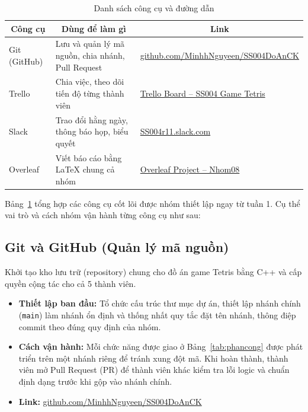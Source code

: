 \documentclass[a4paper]{article}
\begin{document}
\begin{table}[H]
\centering

\begin{tabularx}{\linewidth}{|l|X|X|}
\hline
\multicolumn{1}{|c|}{\textbf{Công cụ}} & \multicolumn{1}{c|}{\textbf{Dùng để làm gì}} & \multicolumn{1}{c|}{\textbf{Link}} \\ \hline
Git (GitHub) & Lưu và quản lý mã nguồn, chia nhánh, Pull Request & \href{https://github.com/MinhhNguyeen/SS004_nhom_08_do_an_CK}{github.com/\allowbreak MinhhNguyeen/\allowbreak SS004DoAnCK} \\ \hline
Trello & Chia việc, theo dõi tiến độ từng thành viên & \href{https://trello.com/invite/b/6af84160c54fc0dafaafce3b/ATTI29c2d3e7597facc604c6370312c5b80052E181AA/dồ-an-cuối-kỳ-ss004}{Trello Board – SS004 Game Tetris} \\ \hline
Slack & Trao đổi hằng ngày, thông báo họp, biểu quyết & \href{https://ss004r11.slack.com/archives/C0CH1U6903G}{SS004r11.slack.com} \\ \hline
Overleaf & Viết báo cáo bằng LaTeX chung cả nhóm & \href{https://www.overleaf.com/project/6af83e9e4f8b6aee6f0ea2c8/share\#5a734a4d15dd4ae4e4d5203e0dd4c16b979b7dc121b1d5cd}{Overleaf Project – Nhom08} \\ \hline
\end{tabularx}
\vspace{8pt}
\caption{Danh sách công cụ và đường dẫn}
\label{tab:congcu}
\end{table}

Bảng~\ref{tab:congcu} tổng hợp các công cụ cốt lõi được nhóm thiết lập ngay từ tuần 1. Cụ thể vai trò và cách nhóm vận hành từng công cụ như sau:

\subsection{Git và GitHub (Quản lý mã nguồn)}
Khởi tạo kho lưu trữ (repository) chung cho đồ án game Tetris bằng C++ và cấp quyền cộng tác cho cả 5 thành viên.
\begin{itemize}

\item \textbf{Thiết lập ban đầu:} Tổ chức cấu trúc thư mục dự án, thiết lập nhánh chính (\texttt{main}) làm nhánh ổn định và thống nhất quy tắc đặt tên nhánh, thông điệp commit theo đúng quy định của nhóm.

\item \textbf{Cách vận hành:} Mỗi chức năng được giao ở Bảng~\ref{tab:phancong} được phát triển trên một nhánh riêng để tránh xung đột mã. Khi hoàn thành, thành viên mở Pull Request (PR) để thành viên khác kiểm tra lỗi logic và chuẩn định dạng trước khi gộp vào nhánh chính.
    \item \textbf{Link:} \href{https://github.com/MinhhNguyeen/SS004_nhom_08_do_an_CK}{github.com/\allowbreak MinhhNguyeen/\allowbreak SS004DoAnCK}
    
\end{itemize}
\end{document}

